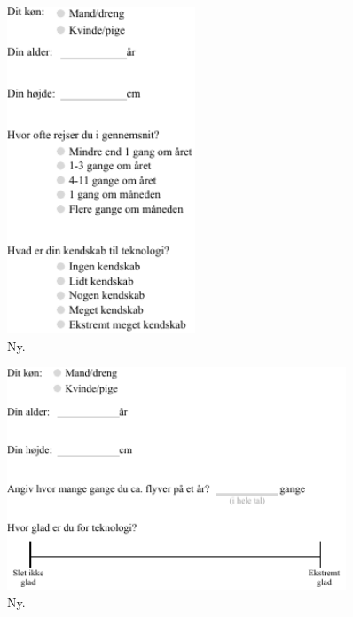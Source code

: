 %
\begin{figure}[H]
\centering
\includegraphics[width = 0.5\textwidth]{Figure/TestdesignEvaluering/Demografi} 
\caption{Ny.}
\label{fig:Demografi}
\end{figure}
\noindent
%

%
\begin{figure}[H]
\centering
\includegraphics[width = 0.9\textwidth]{Figure/TestdesignEvaluering/TilpassetDemografi} 
\caption{Ny.}
\label{fig:TilpassetDemografi}
\end{figure}
\noindent
%


